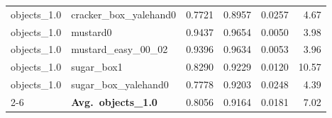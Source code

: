 \begin{longtable}{llrrrr}
  objects_1.0 & cracker\_box\_yalehand0 & 0.7721 & 0.8957 & 0.0257 & 4.67 \\
  objects_1.0 & mustard0 & 0.9437 & 0.9654 & 0.0050 & 3.98 \\
  objects_1.0 & mustard\_easy\_00\_02 & 0.9396 & 0.9634 & 0.0053 & 3.96 \\
  objects_1.0 & sugar\_box1 & 0.8290 & 0.9229 & 0.0120 & 10.57 \\
  objects_1.0 & sugar\_box\_yalehand0 & 0.7778 & 0.9203 & 0.0248 & 4.39 \\
  \cmidrule{2-6}
  & \textbf{Avg.~objects_1.0} & 0.8056 & 0.9164 & 0.0181 & 7.02 \\
  \midrule
\bottomrule
\end{longtable}